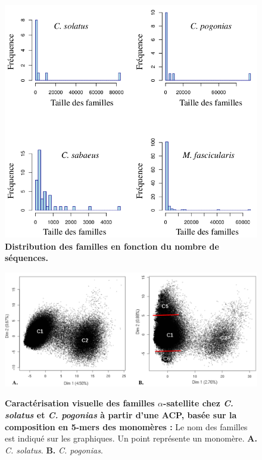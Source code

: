 \documentclass[12pt,a4paper]{article}
\begin{document}
		\begin{figure}
			\center
			\includegraphics[scale=0.45]{img/distribution_familles.png}
			\caption{\textbf{Distribution des familles en fonction du nombre de séquences.}}
			\label{dist_fam} 
		\end{figure}
		
		\begin{figure}	
			\includegraphics[scale=0.4]{img/ACP_experimental.png}  \\
			\caption{\textbf{Caractérisation visuelle des familles $\alpha$-satellite chez \textit{C. solatus} et \textit{C. pogonias} à partir d'une ACP, basée sur la composition en 5-mers des monomères :} Le nom des familles est indiqué sur les graphiques. Un point représente un monomère. \textbf{A.} \textit{C. solatus}. \textbf{B.} \textit{C. pogonias}.}
			\label{fig:ACP_exp} 
	\end{figure}
			
\end{document}

